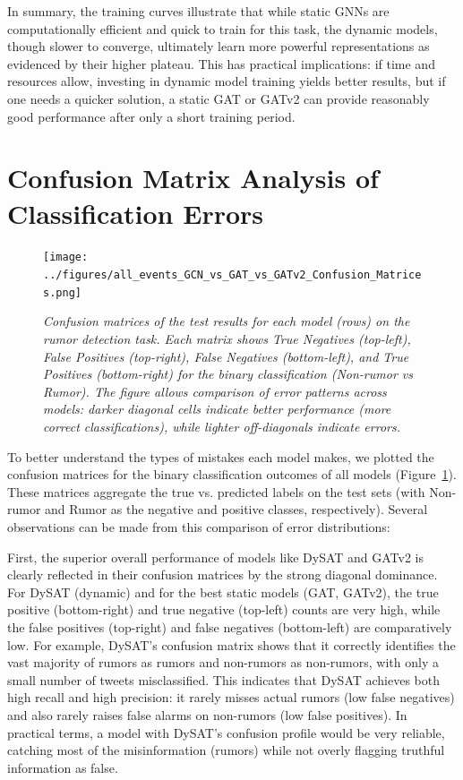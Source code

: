 \documentclass{cshonours}
\begin{document}
In summary, the training curves illustrate that while static GNNs are computationally efficient and quick to train for this task, the dynamic models, though slower to converge, ultimately learn more powerful representations as evidenced by their higher plateau. This has practical implications: if time and resources allow, investing in dynamic model training yields better results, but if one needs a quicker solution, a static GAT or GATv2 can provide reasonably good performance after only a short training period.

\section{Confusion Matrix Analysis of Classification Errors}

\begin{figure}
\centering
\texttt{[image: ../figures/all\_events\_GCN\_vs\_GAT\_vs\_GATv2\_Confusion\_Matrices.png]}
\caption[Confusion matrices for each model]{\textit{Confusion matrices of the test results for each model (rows) on the rumor detection task. Each matrix shows True Negatives (top-left), False Positives (top-right), False Negatives (bottom-left), and True Positives (bottom-right) for the binary classification (Non-rumor vs Rumor). The figure allows comparison of error patterns across models: darker diagonal cells indicate better performance (more correct classifications), while lighter off-diagonals indicate errors.}}
\label{fig:conf_matrices}
\end{figure}

To better understand the types of mistakes each model makes, we plotted the confusion matrices for the binary classification outcomes of all models (Figure~\ref{fig:conf_matrices}). These matrices aggregate the true vs. predicted labels on the test sets (with Non-rumor and Rumor as the negative and positive classes, respectively). Several observations can be made from this comparison of error distributions:

First, the superior overall performance of models like DySAT and GATv2 is clearly reflected in their confusion matrices by the strong diagonal dominance. For DySAT (dynamic) and for the best static models (GAT, GATv2), the true positive (bottom-right) and true negative (top-left) counts are very high, while the false positives (top-right) and false negatives (bottom-left) are comparatively low. For example, DySAT’s confusion matrix shows that it correctly identifies the vast majority of rumors as rumors and non-rumors as non-rumors, with only a small number of tweets misclassified. This indicates that DySAT achieves both high recall and high precision: it rarely misses actual rumors (low false negatives) and also rarely raises false alarms on non-rumors (low false positives). In practical terms, a model with DySAT’s confusion profile would be very reliable, catching most of the misinformation (rumors) while not overly flagging truthful information as false.
\end{document}
